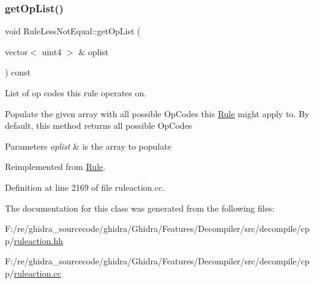 \subsubsection{\texorpdfstring{getOpList()}{getOpList()}}
{\footnotesize\ttfamily void Rule\+Less\+Not\+Equal\+::get\+Op\+List (\begin{DoxyParamCaption}\item[{vector$<$ uint4 $>$ \&}]{oplist }\end{DoxyParamCaption}) const\hspace{0.3cm}{\ttfamily [virtual]}}



List of op codes this rule operates on. 

Populate the given array with all possible Op\+Codes this \mbox{\hyperlink{class_rule}{Rule}} might apply to. By default, this method returns all possible Op\+Codes 
\begin{DoxyParams}{Parameters}
{\em oplist} & is the array to populate \\
\hline
\end{DoxyParams}


Reimplemented from \mbox{\hyperlink{class_rule_a4023bfc7825de0ab866790551856d10e}{Rule}}.



Definition at line 2169 of file ruleaction.\+cc.



The documentation for this class was generated from the following files\+:\begin{DoxyCompactItemize}
\item 
F\+:/re/ghidra\+\_\+sourcecode/ghidra/\+Ghidra/\+Features/\+Decompiler/src/decompile/cpp/\mbox{\hyperlink{ruleaction_8hh}{ruleaction.\+hh}}\item 
F\+:/re/ghidra\+\_\+sourcecode/ghidra/\+Ghidra/\+Features/\+Decompiler/src/decompile/cpp/\mbox{\hyperlink{ruleaction_8cc}{ruleaction.\+cc}}\end{DoxyCompactItemize}
